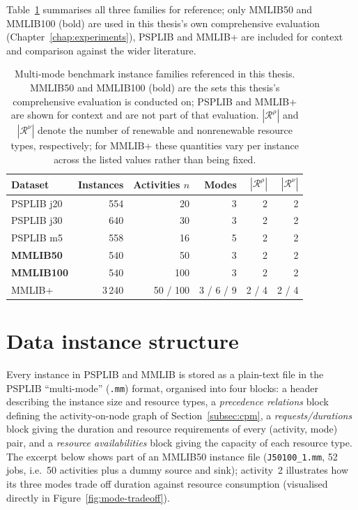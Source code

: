 Table~\ref{tab:datasets} summarises all three families for reference; only
MMLIB50 and MMLIB100 (bold) are used in this thesis's own comprehensive
evaluation (Chapter~\ref{chap:experiments}), PSPLIB and MMLIB+ are included
for context and comparison against the wider literature.

\begin{table}[htbp]
  \centering
  \caption{Multi-mode benchmark instance families referenced in this
  thesis. MMLIB50 and MMLIB100 (bold) are the sets this thesis's
  comprehensive evaluation is conducted on; PSPLIB and MMLIB+ are shown for
  context and are not part of that evaluation.
  $|\mathcal{R}^{\rho}|$ and $|\mathcal{R}^{\nu}|$ denote the number of renewable and
  nonrenewable resource types, respectively; for MMLIB+ these quantities vary
  per instance across the listed values rather than being fixed.}
  \label{tab:datasets}
  \begin{tabular}{l r r r r r}
    \toprule
    \textbf{Dataset} & \textbf{Instances} & \textbf{Activities $n$} & \textbf{Modes} & $|\mathcal{R}^{\rho}|$ & $|\mathcal{R}^{\nu}|$ \\
    \midrule
    PSPLIB j20  & 554   & 20      & 3 & 2 & 2 \\
    PSPLIB j30  & 640   & 30      & 3 & 2 & 2 \\
    PSPLIB m5   & 558   & 16      & 5 & 2 & 2 \\
    \textbf{MMLIB50}     & 540   & 50      & 3 & 2 & 2 \\
    \textbf{MMLIB100}    & 540   & 100     & 3 & 2 & 2 \\
    MMLIB+      & 3\,240 & 50 / 100 & 3 / 6 / 9 & 2 / 4 & 2 / 4 \\
    \bottomrule
  \end{tabular}
\end{table}

\section{Data instance structure}
\label{sec:instance-structure}

Every instance in PSPLIB and MMLIB is stored as a plain-text file in the
PSPLIB ``multi-mode'' (\texttt{.mm}) format, organised into four blocks: a
header describing the instance size and resource types, a
\emph{precedence relations} block defining the activity-on-node graph of
Section~\ref{subsec:cpm}, a \emph{requests/durations} block giving the
duration and resource requirements of every (activity, mode) pair, and a
\emph{resource availabilities} block giving the capacity of each resource
type. The excerpt below shows part of an MMLIB50 instance file
(\texttt{J50100\_1.mm}, 52 jobs, i.e.\ 50 activities plus a dummy source and
sink); activity~2 illustrates how its three modes trade off duration against
resource consumption (visualised directly in Figure~\ref{fig:mode-tradeoff}).

